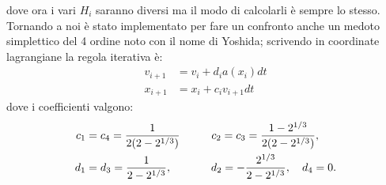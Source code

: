 \documentclass[10pt,a4paper]{article}
\begin{document}
dove ora i vari $H_i$ saranno diversi ma il modo di calcolarli è sempre lo stesso.
Tornando a noi è stato implementato per fare un confronto anche un medoto simplettico del 4 ordine noto con il nome di Yoshida; scrivendo in coordinate lagrangiane la regola iterativa è:
\begin{align}
v_{i+1} &= v_{i} + d_{i} a(x_{i}) dt \\
x_{i+1} &= x_{i} + c_{i} v_{i+1} dt
\end{align}
dove i coefficienti valgono:
\begin{align}
 c_1 &= c_4 = \frac{1}{2(2-2^{1/3})} \hspace{10 mm} c_2 = c_3 = \frac{1-2^{1/3}}{2(2-2^{1/3})}, \\
 d_1 &= d_3 = \frac{1}{2-2^{1/3}}, \hspace{12.5 mm} d_2 = -\frac{2^{1/3}}{2-2^{1/3}}, \quad d_4 = 0.
\end{align}
\end{document}
